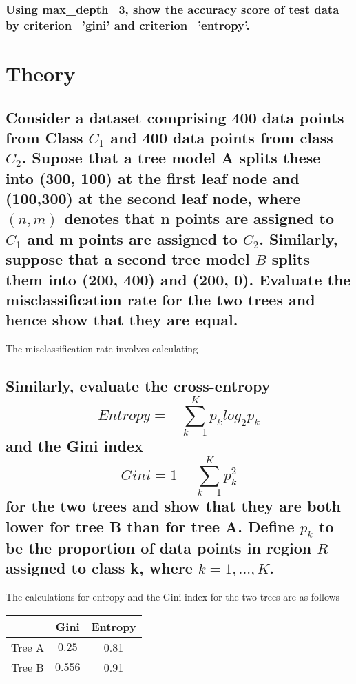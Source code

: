 \documentclass{article}
\begin{document}
		\subsubsection{Using max\_depth=3, show the accuracy score of test data by criterion='gini' 
						and criterion='entropy'.}
\section{Theory}
	\subsection{Consider a dataset comprising 400 data points from Class $C_{1}$ and 400 data points 
		from class $C_{2}$. Supose that a tree model A splits these into (300, 100) at the first leaf
		node and (100,300) at the second leaf node, where $(n,m)$ denotes that n points are assigned 
		to $C_{1}$ and m points are assigned to $C_{2}$. Similarly, suppose that a second tree model $B$
		splits them into (200, 400) and (200, 0). Evaluate the misclassification rate for the two trees
		and hence show that they are equal.}
		
		The misclassification rate involves calculating 
	\subsection{Similarly, evaluate the cross-entropy 
		\[ Entropy = - \sum_{k = 1}^{K}p_{k}log_{2}p_{k}\]
		and the Gini index
		\[ Gini = 1 - \sum_{k = 1}^{K}p^{2}_{k}\]
		for the two trees and show that they are both lower for tree B than for tree A. Define $p_{k}$
		to be the proportion of data points in region $R$ assigned to class k, where $k = 1,...,K$.
		}
		The calculations for entropy and the Gini index for the two trees are as follows

		\begin{center}
		\begin{tabular}{|c | c | c |}
			\hline
			 & Gini & Entropy\\\hline
			Tree A & $0.25$ & 0.81\\\hline
			Tree B & $0.556$ & 0.91 \\
			\hline
		\end{tabular}
		\end{center}
\end{document}
